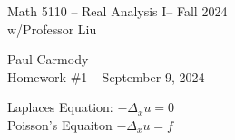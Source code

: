 \documentclass[10pt,a4paper]{report}
\newcommand{\CLASSNAME}{Math 5110 -- Real Analysis I}
\newcommand{\STUDENTNAME}{Paul Carmody}
\newcommand{\ASSIGNMENT}{Homework \#1 }
\newcommand{\DUEDATE}{September 9, 2024}
\newcommand{\SEMESTER}{Fall 2024}
\begin{document}
\begin{center}
	\Large{\CLASSNAME -- \SEMESTER} \\
	\large{ w/Professor Liu}
\end{center}
\begin{center}
	\STUDENTNAME \\
	\ASSIGNMENT -- \DUEDATE\\
\end{center} 

Laplaces Equation: $-\Delta_x u=0$ \\
Poisson's Equaiton $-\Delta_xu=f$ \\
\end{document}
